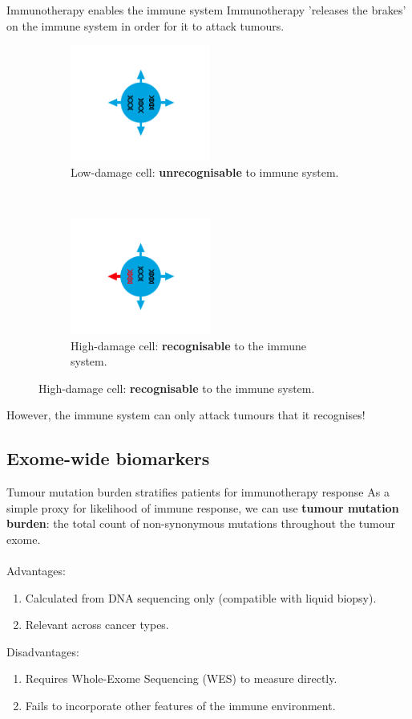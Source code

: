 \documentclass{beamer}
\begin{document}
\begin{frame}{Immunotherapy enables the immune system}
Immunotherapy 'releases the brakes' on the immune system in order for it to attack tumours.
\begin{figure}[t!]
    \centering
    \begin{subfigure}[t]{0.45\textwidth}
        \centering
        \includegraphics[height=1.5in]{figures/IC1.png}
        \caption{Low-damage cell: \textbf{unrecognisable} to immune system.}
    \end{subfigure}
    ~ 
    \begin{subfigure}[t]{0.45\textwidth}
        \centering
        \includegraphics[height=1.5in]{figures/IC2.png}
        \caption{High-damage cell: \textbf{recognisable} to the immune system.}
    \end{subfigure}
\end{figure}
However, the immune system can only attack tumours that it recognises!
\end{frame}

\subsection{Exome-wide biomarkers}


\begin{frame}{Tumour mutation burden stratifies patients for immunotherapy response}
As a simple proxy for likelihood of immune response, we can use \textbf{tumour mutation burden}: the total count of non-synonymous mutations throughout the tumour exome. \\
~\\
Advantages:
\begin{enumerate}[I]
    \item Calculated from DNA sequencing only (compatible with liquid biopsy).
    \item Relevant across cancer types.
\end{enumerate}
Disadvantages:
\begin{enumerate}[I]
    \item Requires Whole-Exome Sequencing (WES) to measure directly. 
    \item Fails to incorporate other features of the immune environment.
\end{enumerate}



\end{frame}
\end{document}
